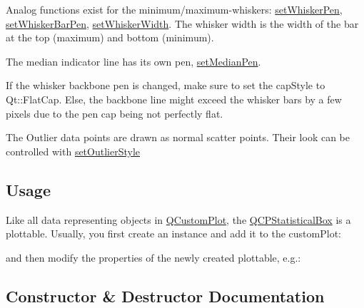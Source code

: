 Analog functions exist for the minimum/maximum-\/whiskers\+: \hyperlink{classQCPStatisticalBox_a4a5034cb3b9b040444df05ab1684620b}{set\+Whisker\+Pen}, \hyperlink{classQCPStatisticalBox_aa8d3e503897788e1abf68dc74b5f147f}{set\+Whisker\+Bar\+Pen}, \hyperlink{classQCPStatisticalBox_adf378812446bd66f34d1f7f293d991cd}{set\+Whisker\+Width}. The whisker width is the width of the bar at the top (maximum) and bottom (minimum).

The median indicator line has its own pen, \hyperlink{classQCPStatisticalBox_a7260ac55b669f5d0a74f16d5ca84c52c}{set\+Median\+Pen}.

If the whisker backbone pen is changed, make sure to set the cap\+Style to Qt\+::\+Flat\+Cap. Else, the backbone line might exceed the whisker bars by a few pixels due to the pen cap being not perfectly flat.

The Outlier data points are drawn as normal scatter points. Their look can be controlled with \hyperlink{classQCPStatisticalBox_ad5241943422eb8e58360a97e99ad6aa7}{set\+Outlier\+Style}\hypertarget{classQCPStatisticalBox_usage}{}\subsection{Usage}\label{classQCPStatisticalBox_usage}
Like all data representing objects in \hyperlink{classQCustomPlot}{Q\+Custom\+Plot}, the \hyperlink{classQCPStatisticalBox}{Q\+C\+P\+Statistical\+Box} is a plottable. Usually, you first create an instance and add it to the custom\+Plot\+: 
\begin{DoxyCodeInclude}
\end{DoxyCodeInclude}
and then modify the properties of the newly created plottable, e.\+g.\+: 
\begin{DoxyCodeInclude}
\end{DoxyCodeInclude}


\subsection{Constructor \& Destructor Documentation}
